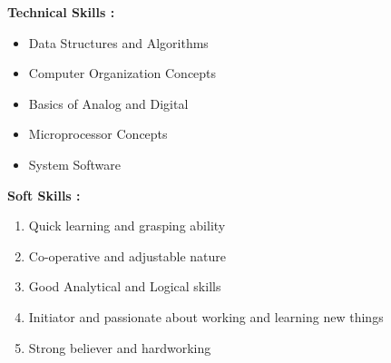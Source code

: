 \documentclass[11pt,a4paper]{article}
\begin{document}
\newpage
\begin{multicols}{3}
	\begin{minipage}{0.15\paperwidth}
		\textbf{Technical\linebreak
		Skills : }
	\end{minipage}
	\begin{minipage}{0.35\paperwidth}
		\begin{flushleft}
		\begin{itemize}
			\item Data Structures and Algorithms
			\item Computer Organization\linebreak
			Concepts
		\end{itemize}
	\end{flushleft}
	\end{minipage}
	\begin{flushright}
	\begin{minipage}{0.35\paperwidth}
		\begin{flushleft}
		\begin{itemize}
			\item Basics of Analog and Digital
			\item Microprocessor Concepts
			\item System Software
		\end{itemize}
		\end{flushleft}
	\end{minipage}
	\end{flushright}
\end{multicols}
\hfill
\begin{multicols}{2}
	\begin{minipage}{0.15\paperwidth}
		\textbf{Soft Skills :}
	\end{minipage}
	\begin{minipage}{0.7\paperwidth}
		\begin{enumerate}
			\item Quick learning and grasping ability
			\item Co-operative and adjustable nature
			\item Good Analytical and Logical skills
			\item Initiator and passionate about working and learning new things
			\item Strong believer and hardworking
		\end{enumerate}
	\end{minipage}
\end{multicols}
\hfill
\end{document}
